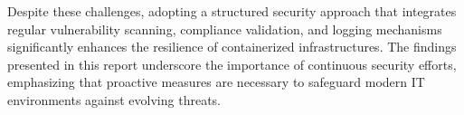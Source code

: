 \documentclass[12pt,a4paper]{report}
\begin{document}
Despite these challenges, adopting a structured security approach that integrates regular vulnerability scanning, compliance validation, and logging mechanisms significantly enhances the resilience of containerized infrastructures. The findings presented in this report underscore the importance of continuous security efforts, emphasizing that proactive measures are necessary to safeguard modern IT environments against evolving threats.
\end{document}
